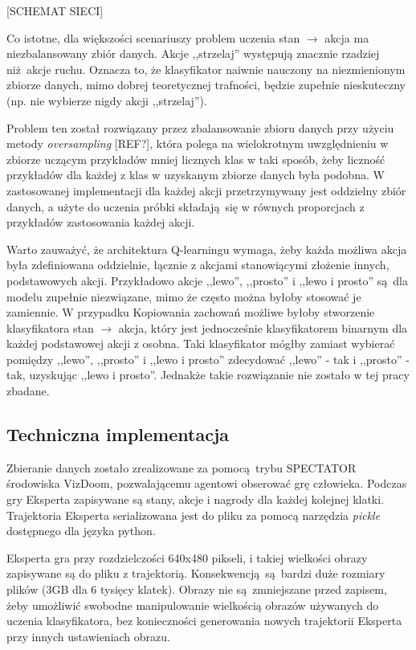 [SCHEMAT SIECI]

Co istotne, dla większości scenariuszy problem uczenia stan $\to$ akcja ma niezbalansowany zbiór danych. Akcje ,,strzelaj'' występują znacznie rzadziej niż akcje ruchu. Oznacza to, że klasyfikator naiwnie nauczony na niezmienionym zbiorze danych, mimo dobrej teoretycznej trafności, będzie zupełnie nieskuteczny (np. nie wybierze nigdy akcji ,,strzelaj'').

Problem ten został rozwiązany przez zbalansowanie zbioru danych przy użyciu metody \textit{oversampling} [REF?], która polega na wielokrotnym uwzględnieniu w zbiorze uczącym przykładów mniej licznych klas w taki sposób, żeby liczność przykładów dla każdej z klas w uzyskanym zbiorze danych była podobna. W zastosowanej implementacji dla każdej akcji przetrzymywany jest oddzielny zbiór danych, a użyte do uczenia próbki składają się w równych proporcjach z przykładów zastosowania każdej akcji. 

Warto zauważyć, że architektura Q-learningu wymaga, żeby każda możliwa akcja była zdefiniowana oddzielnie, łącznie z akcjami stanowiącymi złożenie innych, podstawowych akcji. Przykładowo akcje ,,lewo'', ,,prosto'' i ,,lewo i prosto'' są dla modelu zupełnie niezwiązane, mimo że często można byłoby stosować je zamiennie. W przypadku Kopiowania zachowań możliwe byłoby stworzenie klasyfikatora  stan $\to$ akcja, który jest jednocześnie klasyfikatorem binarnym dla każdej podstawowej akcji z osobna. Taki klasyfikator mógłby zamiast wybierać pomiędzy ,,lewo'', ,,prosto'' i ,,lewo i prosto'' zdecydować ,,lewo'' - tak i ,,prosto'' - tak, uzyskując ,,lewo i prosto''. Jednakże takie rozwiązanie nie zostało w tej pracy zbadane.

\subsection{Techniczna implementacja}

Zbieranie danych zostało zrealizowane za pomocą trybu SPECTATOR środowiska VizDoom, pozwalającemu agentowi obserować grę człowieka. Podczas gry Eksperta zapisywane są stany, akcje i nagrody dla każdej kolejnej klatki. Trajektoria Eksperta serializowana jest do pliku za pomocą narzędzia \textit{pickle} dostępnego dla języka python.

Eksperta gra przy rozdzielczości 640x480 pikseli, i takiej wielkości obrazy zapisywane są do pliku z trajektorią. Konsekwencją są bardzi duże rozmiary plików (3GB dla 6 tysięcy klatek). Obrazy nie są zmniejszane przed zapisem, żeby umożliwić swobodne manipulowanie wielkością obrazów używanych do uczenia klasyfikatora, bez konieczności generowania nowych trajektorii Eksperta przy innych ustawieniach obrazu.

